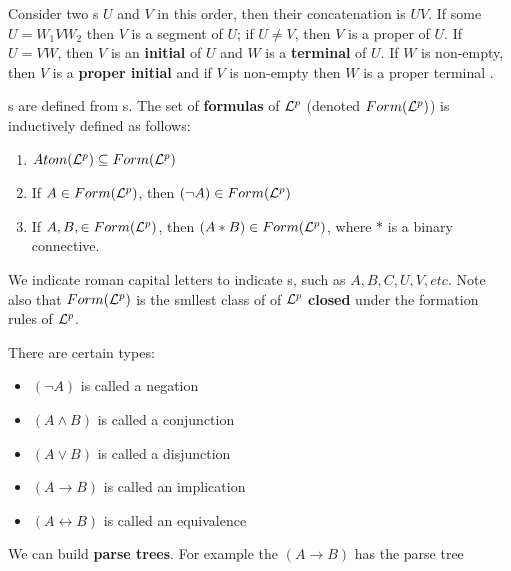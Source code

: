 \documentclass[english, 11pt]{article}
\begin{document}
  \begin{defn}[segment]
    \label{segment}
  \end{defn}Consider two s $U$ and $V$ in this order, then their concatenation is $UV$. If some  $U = W_1VW_2$ then $V$ is a segment of $U$; if $U \not = V$, then $V$ is a proper  of $U$. If $U = VW$, then $V$ is an \textbf{initial}  of $U$ and $W$ is a \textbf{terminal}  of $U$. If $W$ is non-empty, then $V$ is a \textbf{proper initial } and if $V$ is non-empty then $W$ is a proper terminal .

  \begin{defn}[formula]
  \label{formula}
    s are defined from s. The set of \textbf{formulas} of $\mathcal{L}^p$ (denoted $Form(\mathcal{L}^p)$) is inductively defined as follows:
    \begin{enumerate}
      \item $Atom(\mathcal{L}^p) \subseteq Form(\mathcal{L}^p)$
      \item If $A \in Form(\mathcal{L}^p)$, then $(\neg A) \in Form(\mathcal{L}^p)$
      \item If $A, B, \in Form(\mathcal{L}^p)$, then $(A * B) \in Form(\mathcal{L}^p)$, where $*$ is a binary connective.
    \end{enumerate}
  \end{defn}

  We indicate roman capital letters to indicate s, such as $A, B, C, U, V, etc$. Note also that $Form(\mathcal{L}^p)$ is the smllest class of  of $\mathcal{L}^p$ \textbf{closed} under the formation rules of $\mathcal{L}^p$.

  There are certain  types:
  \begin{itemize}
    \item $(\neg A)$ is called a negation
    \item $(A \land B)$ is called a conjunction
    \item $(A \lor B)$ is called a disjunction
    \item $(A \rightarrow B)$ is called an implication
    \item $(A \leftrightarrow B)$ is called an equivalence
  \end{itemize}

  We can build \textbf{parse trees}. For example the  $(A \rightarrow B)$ has the parse tree

\end{document}
